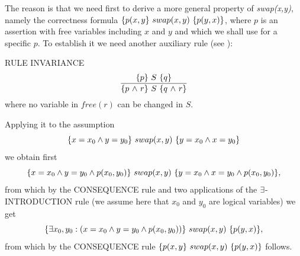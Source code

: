 \documentclass[runningheads]{llncs}       %
\begin{document}
The reason is that we need first to derive a more general property of
\emph{swap(x,y)}, namely the correctness formula
$\mbox{$\{{p(x,y}\}\ {swap(x,y)}\ \{{p(y,x)}\}$}$, where $p$ is an assertion with free
variables including $x$ and $y$ and which we shall use for a specific
$p$.  To establish it we need another auxiliary rule (see \cite[page
468]{ABO09}):

\III

\NI
RULE \label{rul:inv} INVARIANCE
\[ 
 \frac{ \mbox{$\{{p}\}\ {S}\ \{{q}\}$} }
      { \mbox{$\{{p \mbox{$\ \wedge\ $} r}\}\ {S}\ \{{q \mbox{$\ \wedge\ $} r}\}$}         } 
\]
where no variable in $\mathit{free}(r)$ can be changed in $S$.
\III

Applying it to the assumption
\[
  \mbox{$\{{x=x_0 \wedge y=y_0}\}\ {swap(x,y)}\ \{{y=x_0 \wedge x=y_0}\}$}
\]
we obtain first
\[
  \mbox{$\{{x=x_0 \wedge y=y_0 \wedge p(x_0,y_0)}\}\ {swap(x,y)}\ \{{y=x_0 \wedge x=y_0 \wedge p(x_0,y_0)}\}$},
\]
from which by the CONSEQUENCE rule and two applications of
the $\mbox{$\exists$}$-INTRODUCTION rule (we assume here that $x_0$ and $y_0$ are logical variables)
we get
\[
  \mbox{$\{{\mbox{$\exists$} x_0, y_0: (x=x_0 \wedge y=y_0 \wedge p(x_0,y_0))}\}\ {swap(x,y)}\ \{{p(y,x)}\}$},
\]
from which  by the CONSEQUENCE rule $\mbox{$\{{p(x,y}\}\ {swap(x,y)}\ \{{p(y,x)}\}$}$ follows.


\end{document}
